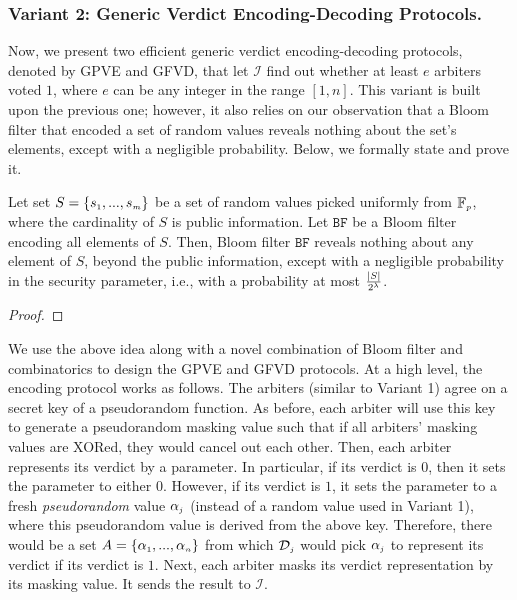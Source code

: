 \subsubsection{Variant 2: Generic Verdict  Encoding-Decoding Protocols.} Now, we present two  efficient generic verdict  encoding-decoding protocols, denoted by GPVE and GFVD,  that let $\mathcal{I}$ find out whether at least $e$ arbiters voted $1$, where $e$ can be any integer in the range $[1, n]$. This variant is  built upon the previous one; however, it also relies on our observation that a Bloom filter that encoded a set of random values reveals nothing about the set's elements, except with a negligible probability. Below, we formally state and prove it. 


\begin{theorem}
Let set $S=\{s_{\scriptscriptstyle 1},..., s_{\scriptscriptstyle m}\}$ be a set of random values picked uniformly from $\mathbb{F}_{\scriptscriptstyle p}$, where the cardinality of $S$ is  public information. Let $\mathtt{BF}$ be a Bloom filter encoding all elements of   $S$. Then, Bloom filter $\mathtt{BF}$ reveals nothing about any element of $S$, beyond the public information, except with a negligible probability in the security parameter, i.e., with a probability at most $\frac{|S|}{2^{\scriptscriptstyle \lambda}}$. 
\end{theorem}

\begin{proof}

\end{proof}


We use the above idea along with a novel combination of Bloom filter and combinatorics to design the GPVE and GFVD protocols.  At a high level, the encoding protocol works as follows.  The arbiters (similar to Variant 1) agree on a secret key of a pseudorandom function. As before, each arbiter will use this key to  generate a pseudorandom masking value such that if all arbiters' masking values are XORed, they would cancel out each other. Then, each arbiter represents its verdict by a parameter. In particular, if its verdict is $0$, then  it  sets the parameter to either $0$. However, if   its verdict is $1$, it sets the parameter to a fresh \emph{pseudorandom} value $\alpha_{\scriptscriptstyle j}$ (instead of a random value used in Variant 1),  where this  pseudorandom value is derived from the above key. Therefore, there would be a set $A=\{\alpha_{\scriptscriptstyle 1},..., \alpha_{\scriptscriptstyle n}\}$ from which  $\mathcal{D}_{\scriptscriptstyle j}$ would pick $\alpha_{\scriptscriptstyle j}$ to represent its verdict if its verdict is $1$. Next, each arbiter masks its verdict representation by its masking  value. It sends the result to 
 $\mathcal{I}$.
 




